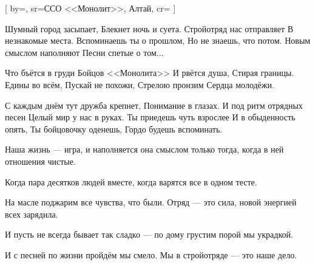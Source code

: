 [
  by={},
  sr={ССО <<Монолит>>, Алтай},
  cr={}
  ]


\ifdefined\EXPLAINED
	
\else 

\fi


\beginverse
Шумный город засыпает,
Блекнет ночь и суета.
Стройотряд нас отправляет
В незнакомые места.
Вспоминаешь ты о прошлом,
Но не знаешь, что потом.
Новым смыслом наполняют
Песни спетые о том...
\endverse


\beginchorus
Что бъётся в груди
Бойцов <<Монолита>>
И рвётся душа,
Стирая границы.
Едины во всём,
Пускай не похожи,
Стрелою пронзим
Сердца молодёжи.
\endchorus


\beginverse
С каждым днём тут дружба крепнет,
Понимание в глазах.
И под ритм отрядных песен
Целый мир у нас в руках.
Ты приедешь чуть взрослее
И в обыденность опять,
Ты бойцовочку оденешь,
Гордо будешь вспоминать.

\endverse


\beginverse
Наша жизнь --- игра, и наполняется она смыслом 
только тогда, когда в ней отношения чистые. 

Когда пара десятков людей вместе, 
когда варятся все в одном тесте. 

На масле поджарим все чувства, что были. 
Отряд --- это сила, новой энергией всех зарядила. 

И пусть не всегда бывает так сладко --- 
по дому грустим порой мы украдкой. 

И с песней по жизни пройдём мы смело. 
Мы в стройотряде --- это наше дело.
\endverse


\endsong


